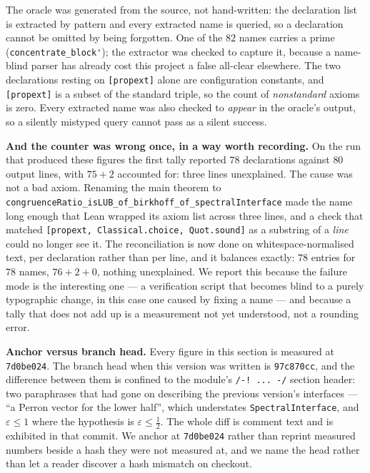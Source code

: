 \documentclass[11pt,a4paper]{article}
\theoremstyle{plain}
\theoremstyle{definition}
\begin{document}
The oracle was generated from the source, not hand-written: the declaration list
is extracted by pattern and every extracted name is queried, so a declaration
cannot be omitted by being forgotten. One of the $82$ names carries a prime
(\verb|concentrate_block'|); the extractor was checked to capture it, because a
name-blind parser has already cost this project a false all-clear elsewhere. The
two declarations resting on \texttt{[propext]} alone are configuration
constants, and \texttt{[propext]} is a subset of the standard triple, so the
count of \emph{nonstandard} axioms is zero. Every extracted name was also checked
to \emph{appear} in the oracle's output, so a silently mistyped query cannot pass
as a silent success.

\textbf{And the counter was wrong once, in a way worth recording.} On the run
that produced these figures the first tally reported $78$ declarations against
$80$ output lines, with $75+2$ accounted for: three lines unexplained. The cause
was not a bad axiom. Renaming the main theorem to
\verb|congruenceRatio_isLUB_of_birkhoff_of_spectralInterface| made the name long
enough that Lean wrapped its axiom list across three lines, and a check that
matched \texttt{[propext, Classical.choice, Quot.sound]} as a substring of a
\emph{line} could no longer see it. The reconciliation is now done on
whitespace-normalised text, per declaration rather than per line, and it balances
exactly: $78$ entries for $78$ names, $76+2+0$, nothing unexplained. We report
this because the failure mode is the interesting one --- a verification script
that becomes blind to a purely typographic change, in this case one caused by
fixing a name --- and because a tally that does not add up is a measurement not
yet understood, not a rounding error.

\textbf{Anchor versus branch head.} Every figure in this section is measured at
\texttt{7d0be024}. The branch head when this version was written is
\texttt{97c870cc}, and the difference between them is confined to the module's
\verb|/-! ... -/| section header: two paraphrases that had gone on describing the
previous version's interfaces --- ``a Perron vector for the lower half'', which
understates \verb|SpectralInterface|, and $\varepsilon\le1$ where the hypothesis
is $\varepsilon\le\tfrac12$. The whole diff is comment text and is exhibited in
that commit. We anchor at \texttt{7d0be024} rather than reprint measured numbers
beside a hash they were not measured at, and we name the head rather than let a
reader discover a hash mismatch on checkout.
\end{document}
